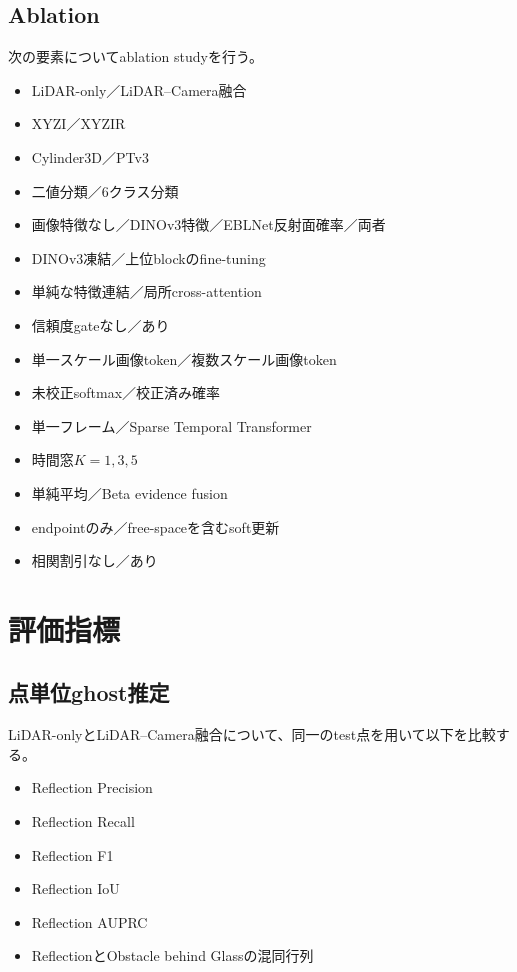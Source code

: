 \documentclass[uplatex,a4paper,11pt]{jsarticle}
\begin{document}
\subsection{Ablation}

次の要素についてablation studyを行う。
\begin{itemize}
  \item LiDAR-only／LiDAR--Camera融合
  \item XYZI／XYZIR
  \item Cylinder3D／PTv3
  \item 二値分類／6クラス分類
  \item 画像特徴なし／DINOv3特徴／EBLNet反射面確率／両者
  \item DINOv3凍結／上位blockのfine-tuning
  \item 単純な特徴連結／局所cross-attention
  \item 信頼度gateなし／あり
  \item 単一スケール画像token／複数スケール画像token
  \item 未校正softmax／校正済み確率
  \item 単一フレーム／Sparse Temporal Transformer
  \item 時間窓$K=1,3,5$
  \item 単純平均／Beta evidence fusion
  \item endpointのみ／free-spaceを含むsoft更新
  \item 相関割引なし／あり
\end{itemize}

\section{評価指標}

\subsection{点単位ghost推定}

LiDAR-onlyとLiDAR--Camera融合について、同一のtest点を用いて以下を比較する。
\begin{itemize}
  \item Reflection Precision
  \item Reflection Recall
  \item Reflection F1
  \item Reflection IoU
  \item Reflection AUPRC
  \item ReflectionとObstacle behind Glassの混同行列
\end{itemize}
\end{document}
